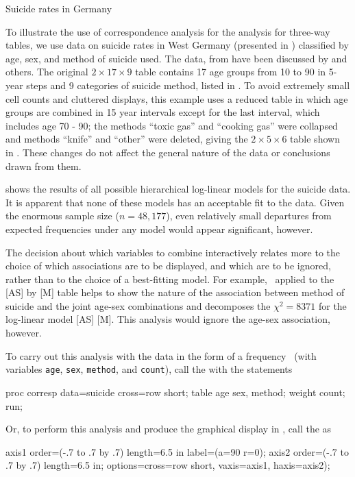 \begin{Example}[suicide1]{Suicide rates in Germany}

To illustrate the use of correspondence analysis for the analysis for
three-way tables, we use data on suicide rates in West Germany
(presented in )
classified by age, sex, and method of suicide used.  The data, from
\citet[Table 1]{Heuer:79}
have been discussed by
\citet{Friendly:91,Friendly:94a,HeijdenLeeuw:85}
and others.
The original \(2
\times  17 \times  9\) table contains 17 age groups from 10 to 90 in
5-year steps and 9 categories of suicide method, listed in . 
To avoid extremely
small cell counts and cluttered displays,
this example uses a reduced table in which age
groups are combined in 15 year intervals except for the last
interval, which includes age 70 - 90; the methods ``toxic gas'' and
``cooking gas'' were collapsed and methods ``knife'' and ``other''
were deleted, giving the \(2 \times  5 \times  6\) table shown in
.  These changes do not affect the general
nature of the data or conclusions drawn from them.


 shows the results of all possible hierarchical
log-linear models for the suicide data.  It is apparent that none of
these models has an acceptable fit to the data.  Given the enormous
sample size (\(n = 48,177\)), even relatively small departures from
expected frequencies under any model would appear significant,
however.


The decision about which variables to combine interactively relates
more to the choice of which associations are to be displayed,
and which are to be ignored, rather than to the choice of a best-fitting
model.  For example,
\CA\ applied to the [AS] by [M] table helps to
show the nature of the association between method of suicide and the
joint age-sex combinations and decomposes the \(\chi^2 = 8371\) for
the log-linear model [AS] [M].  This analysis would ignore the
age-sex association, however.

To carry out this analysis with the
data in the form of a frequency \Dset\
(with variables \texttt{age}, \texttt{sex}, \texttt{method}, and
\texttt{count}),
call the  with the statements
\begin{listing}
proc corresp data=suicide cross=row short;
   table age sex, method;
   weight count;
run;
\end{listing}
Or, to perform this analysis and produce the graphical display in
\figref{fig:suicide51}, call the \macro{CORRESP} as
\begin{listing}
axis1 order=(-.7 to .7 by .7) length=6.5 in label=(a=90 r=0);
axis2 order=(-.7 to .7 by .7) length=6.5 in;
        options=cross=row short, vaxis=axis1, haxis=axis2);
\end{listing}


\end{Example}

